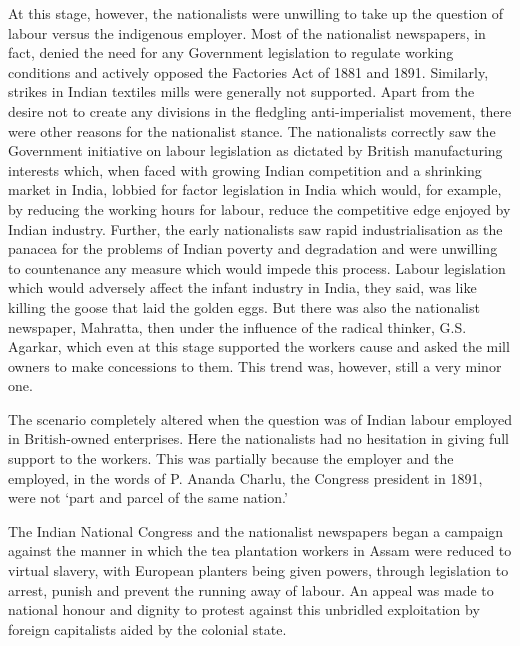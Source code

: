 \begin{multicols}{2}
At this stage, however, the nationalists were unwilling to take up the question of labour versus the indigenous employer. Most of the nationalist newspapers, in fact, denied the need for any Government legislation to regulate working conditions and actively opposed the Factories Act of 1881 and 1891. Similarly, strikes in Indian textiles mills were generally not supported. Apart from the desire not to create any divisions in the fledgling anti-imperialist movement, there were other reasons for the nationalist stance. The nationalists correctly saw the Government initiative on labour legislation as dictated by British manufacturing interests which, when faced with growing Indian competition and a shrinking market in India, lobbied for factor legislation in India which would, for example, by reducing the working hours for labour, reduce the competitive edge enjoyed by Indian industry. Further, the early nationalists saw rapid industrialisation as the panacea for the problems of Indian poverty and degradation and were unwilling to countenance any measure which would impede this process. Labour legislation which would adversely affect the infant industry in India, they said, was like killing the goose that laid the golden eggs. But there was also the nationalist newspaper, Mahratta, then under the influence of the radical thinker, G.S. Agarkar, which even at this stage supported the workers cause and asked the mill owners to make concessions to them. This trend was, however, still a very minor one.

The scenario completely altered when the question was of Indian labour employed in British-owned enterprises. Here the nationalists had no hesitation in giving full support to the workers. This was partially because the employer and the employed, in the words of P. Ananda Charlu, the Congress president in 1891, were not `part and parcel of the same nation.'

The Indian National Congress and the nationalist newspapers began a campaign against the manner in which the tea plantation workers in Assam were reduced to virtual slavery, with European planters being given powers, through legislation to arrest, punish and prevent the running away of labour. An appeal was made to national honour and dignity to protest against this unbridled exploitation by foreign capitalists aided by the colonial state.


\end{multicols}
